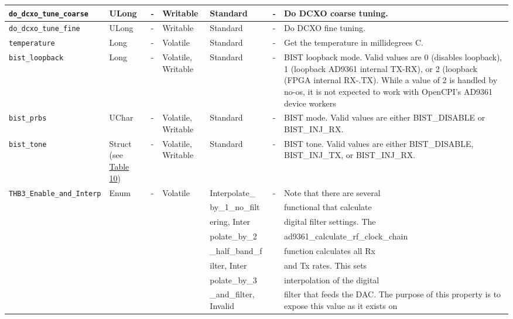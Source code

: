 \documentclass{article}
\begin{document}
\begin{landscape}
\begin{scriptsize}
\begin{longtable}{|p{3.6cm}|p{8.1cm}|p{1.4cm}|p{1.3cm}|p{1.4cm}|p{2.5cm}|p{3.6cm}|}
			\hline
			\verb+do_dcxo_tune_coarse+ & ULong & - & Writable & Standard & - & Do DCXO coarse tuning.\\
			\hline
			\verb+do_dcxo_tune_fine+ & ULong & - & Writable & Standard & - & Do DCXO fine tuning. \\
			\hline
			\verb+temperature+ & Long & - & Volatile & Standard & - & Get the temperature in millidegrees C. \\
			\hline
			\verb+bist_loopback+ & Long & - & Volatile, Writable & Standard & - & BIST loopback mode. Valid values are 0 (disables loopback), 1 (loopback AD9361 internal TX-RX), or 2 (loopback (FPGA internal RX-.TX). While a value of 2 is handled by no-os, it is not expected to work with OpenCPI's AD9361 device workers \\
			\hline
			\verb+bist_prbs+ & UChar & - & Volatile, Writable & Standard & - & BIST mode. Valid values are either BIST\_DISABLE or BIST\_INJ\_RX. \\
			\hline
			\verb+bist_tone+ & Struct (see \hyperlink{tab10}{Table 10}) & - & Volatile, Writable & Standard & - & BIST tone. Valid values are either BIST\_DISABLE, BIST\_INJ\_TX, or BIST\_INJ\_RX. \\
			\hline
			\verb+THB3_Enable_and_Interp+ & Enum & - & Volatile & Interpolate\_ & - &  Note that there are several \\
			                              &      &   &          & by\_1\_no\_filt        &   & functional that calculate \\
			                              &      &   &          & ering, Inter           &   & digital filter settings. The \\
			                              &      &   &          & polate\_by\_2          &   &  ad9361\_calculate\_rf\_clock\_chain \\
			                              &      &   &          & \_half\_band\_f        &   &  function calculates all Rx \\
			                              &      &   &          & ilter, Inter           &   &  and Tx rates. This sets \\
			                              &      &   &          & polate\_by\_3          &   &  interpolation of the digital\\
			                              &      &   &          & \_and\_filter, Invalid &   &  filter that feeds the
                                            DAC. The purpose of this property is
                                            to expose this value as it exists on

\end{longtable}
\end{scriptsize}
\end{landscape}
\end{document}
